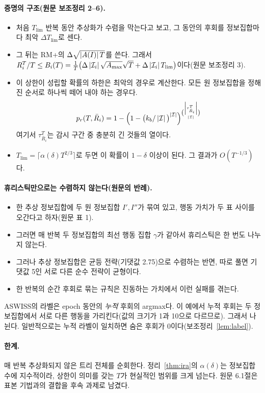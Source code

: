 \paragraph{증명의 구조(원문 보조정리 2–6).}
\begin{itemize}
  \item 처음 $T_{\lim}$ 반복 동안 추상화가 수렴을 막는다고 보고, 그 동안의 후회를 정보집합마다 최악 $\Delta T_{\lim}$로 센다.
  \item 그 뒤는 RM+의 $\Delta\sqrt{\left\lvert A(I)\right\rvert T}$를 쓴다. 그래서 $R_i^T/T\le B_i(T)=\frac1T\big(\Delta\left\lvert \mathcal{I}_i\right\rvert\sqrt{A_{\max}}\sqrt T+\Delta\left\lvert \mathcal{I}_i\right\rvert T_{\lim}\big)$이다(원문 보조정리 3).
  \item 이 상한이 성립할 확률의 하한은 최악의 경우로 계산한다. 모든 원 정보집합을 정해진 순서로 하나씩 떼어 내야 하는 경우다.
    \[
    p_r(T,\bar R_i)=1-\Big(1-\big(k_b/\left\lvert \mathcal{I}\right\rvert\big)^{\left\lvert \mathcal{I}\right\rvert}\Big)^{\binom{\left\lvert \tau^T_{\bar R_i}\right\rvert}{\left\lvert \mathcal{I}\right\rvert}}
    \]
    여기서 $\tau^T_{\bar R_i}$는 감시 구간 중 충분히 긴 것들의 열이다.
  \item $T_{\lim}=\lceil\alpha(\delta)T^{2/3}\rceil$로 두면 이 확률이 $1-\delta$ 이상이 된다. 그 결과가 $O(T^{-1/3})$다.
\end{itemize}

\paragraph{휴리스틱만으로는 수렴하지 않는다(원문의 반례).}
\begin{itemize}
  \item 한 추상 정보집합에 두 원 정보집합 $I',I''$가 묶여 있고, 행동 가치가 두 표 사이를 오간다고 하자(원문 표 1).
  \item 그러면 매 반복 두 정보집합의 최선 행동 집합 $\gamma$가 같아서 휴리스틱은 한 번도 나누지 않는다.
  \item 그러나 추상 정보집합은 균등 전략(기댓값 2.75)으로 수렴하는 반면, 따로 풀면 기댓값 5인 서로 다른 순수 전략이 균형이다.
  \item 한 반복의 순간 후회로 묶는 규칙은 진동하는 가치에서 이런 실패를 겪는다.
\end{itemize}
ASWISS의 라벨은 epoch 동안의 \emph{누적} 후회의 argmax다. 이 예에서 누적 후회는 두 정보집합에서 서로 다른 행동을 가리킨다(값의 크기가 1과 10으로 다르므로). 그래서 나뉜다.
일반적으로는 누적 라벨이 일치하면 숨은 후회가 0이다(보조정리~\ref{lem:label}).

\paragraph{한계.}
매 반복 추상화되지 않은 트리 전체를 순회한다. 정리~\ref{thm:ira}의 $\alpha(\delta)$는 정보집합 수에 지수적이라, 상한이 의미를 갖는 $T$가 현실적인 범위를 크게 넘는다.
원문 6.1절은 표본 기법과의 결합을 후속 과제로 남겼다.
